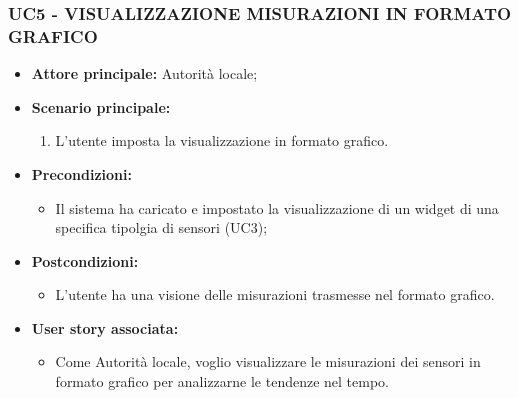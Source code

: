 \subsubsection{UC5 - VISUALIZZAZIONE MISURAZIONI IN FORMATO GRAFICO}
\begin{itemize}
    \item \textbf{Attore principale:} Autorità locale;
    \item \textbf{Scenario principale:}
          \begin{enumerate}
              \item L'utente imposta la visualizzazione in formato grafico.
          \end{enumerate}
    \item \textbf{Precondizioni:}
          \begin{itemize}
            \item Il sistema ha caricato e impostato la visualizzazione di un widget di una specifica tipolgia di sensori (UC3);
          \end{itemize}
    \item \textbf{Postcondizioni:}
          \begin{itemize}
              \item  L'utente ha una visione delle misurazioni trasmesse nel formato grafico.
          \end{itemize}
    \item \textbf{User story associata:}
          \begin{itemize}
              \item Come Autorità locale, voglio visualizzare le misurazioni dei sensori in formato grafico per analizzarne le tendenze nel tempo.
          \end{itemize}
\end{itemize}